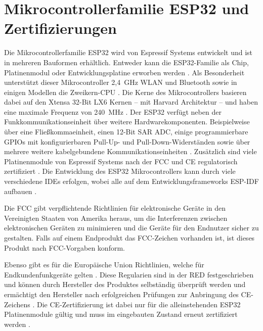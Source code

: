 \section{Mikrocontrollerfamilie ESP32 und Zertifizierungen}
\label{section:esp32Explained}
Die Mikrocontrollerfamilie ESP32 wird von Espressif Systems entwickelt und ist in mehreren Bauformen erhältlich. Entweder kann die ESP32-Familie als Chip, Platinenmodul oder Entwicklungsplatine erworben werden \cites{espressifModules}{espressifDevKit}{espressifSoC}. Als Besonderheit unterstützt dieser Mikrocontroller 2,4~GHz \acs{WLAN} und Bluetooth sowie in einigen Modellen die Zweikern-\acs{CPU} \cites{espressifGetStarted}[S.~8]{espressifTechnicalReference}[S.~24]{espressifTechnicalReference}. Die Kerne des Mikrocontrollers basieren dabei auf den Xtensa 32-Bit LX6 Kernen -- mit Harvard Architektur -- und haben eine maximale Frequenz von 240~MHz \cites{espressifGetStarted}[S.~9]{espressifTechnicalReference}[S.~8]{espressifTechnicalReference}[S.~24]{espressifTechnicalReference}. Der ESP32 verfügt neben der Funkkommunikationseinheit über weitere Hardwarekomponenten. Beispielweise über eine Fließkommaeinheit, einen 12-Bit \ac{SAR} \ac{ADC}, einige programmierbare \acfp{GPIO} mit konfigurierbaren Pull-Up- und Pull-Down-Widerständen sowie über mehrere weitere kabelgebundene Kommunikationseinheiten \cites[S.~10f.]{espressifTechnicalReference}[S.~23]{espressifTechnicalReference}[S.~34]{espressifTechnicalReference}. Zusätzlich sind viele Platinenmodule von Espressif Systems nach der  \ac{FCC} \cite{fccApproval} und \ac{CE} regulatorisch zertifiziert \cite{espressifCertificates}. Die Entwicklung des ESP32 Mikrocontrollers kann durch viele verschiedene \acfp{IDE} erfolgen, wobei alle auf dem Entwicklungsframeworks \ac{ESP-IDF} aufbauen \cites{espressifGetStarted}{espressifIDF}. 

Die \ac{FCC} gibt verpflichtende Richtlinien für elektronische Geräte in den Vereinigten Staaten von Amerika heraus, um die Interferenzen zwischen elektronischen Geräten zu minimieren und die Geräte für den Endnutzer sicher zu gestalten. Falls auf einem Endprodukt das \ac{FCC}-Zeichen vorhanden ist, ist dieses Produkt nach \ac{FCC}-Vorgaben konform. \cite{fccApproval}

Ebenso gibt es für die Europäische Union Richtlinien, welche für Endkundenfunkgeräte gelten \cites{europeanCEMarking}{europeanRED}. Diese Regularien sind in der \ac{RED} festgeschrieben und können durch Hersteller des Produktes selbständig überprüft werden und ermächtigt den Hersteller nach erfolgreichen Prüfungen zur Anbringung des \ac{CE}-Zeichens \cite[S.~14]{europeanFunkanalagen}. Die \ac{CE}-Zertifizierung ist dabei nur für die alleinstehenden ESP32 Platinenmodule gültig und muss im eingebauten Zustand erneut zertifiziert werden \cite{naumannCE}.

